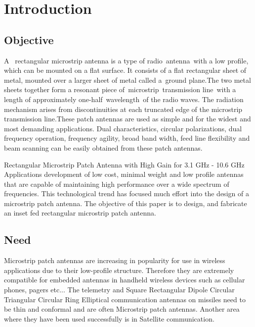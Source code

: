 \documentclass[12pt]{article}
\begin{document}
\tableofcontents
 \thispagestyle{empty}
 \cleardoublepage

\setcounter{page}{1}
\section{Introduction}\label{sec:Introduction}


\subsection{Objective}\label{subs:Objective}
 \justify
   A  rectangular microstrip antenna is a type of radio antenna with a low profile, which can be mounted on a flat surface. It consists of a flat rectangular sheet of metal, mounted over a larger sheet of metal called a ground plane.The two metal sheets together form a resonant piece of microstrip transmission line with a length of approximately one-half wavelength of the radio waves. The radiation mechanism arises from discontinuities at each truncated edge of the microstrip transmission line.These patch antennas are used as simple and for the widest and most demanding applications. Dual characteristics, circular polarizations, dual frequency operation, frequency agility, broad band width, feed line flexibility and beam scanning can be easily obtained from these patch antennas.

 \justify
  Rectangular Microstrip Patch Antenna with High Gain for 3.1 GHz - 10.6 GHz Applications development of low cost, minimal weight and low profile antennas that are capable of maintaining high performance over a wide spectrum of frequencies. This technological trend has focused much effort into the design of a microstrip patch antenna. The objective of this paper is to design, and fabricate an inset fed rectangular microstrip patch antenna.

\subsection{Need}\label{sub:Need}
 \justify
   Microstrip patch antennas are increasing in popularity for use in wireless applications due to their low-profile structure. Therefore they are extremely compatible for embedded antennas in handheld wireless devices such as cellular phones, pagers etc... The telemetry and Square Rectangular Dipole Circular Triangular Circular Ring Elliptical communication antennas on missiles need to be thin and conformal and are often Microstrip patch antennas. Another area where they have been used successfully is in Satellite communication.
\end{document}
